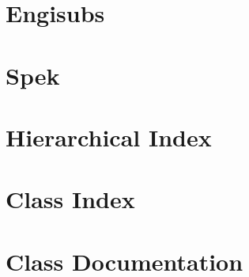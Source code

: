\let\mypdfximage\pdfximage\def\pdfximage{\immediate\mypdfximage}\documentclass[twoside]{book}
\newcommand{\+}{\discretionary{\mbox{\scriptsize$\hookleftarrow$}}{}{}}
\newcommand{\clearemptydoublepage}{%
  \newpage{\pagestyle{empty}\cleardoublepage}%
}
\begin{document}
\chapter{Engisubs}
\label{autotoc_md1}

\chapter{Spek}
\label{md_Spek}

\chapter{Hierarchical Index}

\chapter{Class Index}

\chapter{Class Documentation}















































\backmatter
\newpage
{}
\clearemptydoublepage
{}
\printindex
\end{document}
